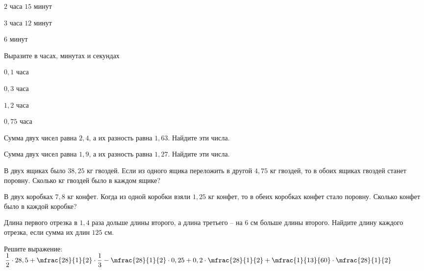 \begin{class}[number=5]
\begin{listofex}
\begin{enumcols}[itemcolumns=4]
			\item \(2\) часа \(15\) минут
			\item \(3\) часа \(12\) минут
			\item \(6\) минут
		\end{enumcols}
		\item Выразите в часах, минутах и секундах
		\begin{enumcols}[itemcolumns=4]
			\item \(0,1\) часа
			\item \(0,3\) часа
			\item \(1,2\) часа
			\item \(0,75\) часа
		\end{enumcols}
		\item Сумма двух чисел равна \(2,4\), а их разность равна \(1,63\). Найдите эти числа.
		\item Сумма двух чисел равна \(1,9\), а их разность равна \(1,27\). Найдите эти числа.
		\item В двух ящиках было \(38,25\) кг гвоздей. Если из одного ящика переложить в другой \(4,75\) кг гвоздей, то в обоих ящиках гвоздей станет поровну. Сколько кг гвоздей было в каждом ящике?
		\item В двух коробках \(7,8\) кг конфет. Когда из одной коробки взяли \(1,25\) кг конфет, то в обеих коробках конфет стало поровну. Сколько конфет было в каждой коробке?
		\item Длина первого отрезка в \(1,4\) раза дольше длины второго, а длина третьего – на \(6\) см больше длины второго. Найдите длину каждого отрезка, если сумма их длин \(125\) см.
		\item Решите выражение: \(\dfrac{1}{2} \cdot 28,5 + \mfrac{28}{1}{2} \cdot \dfrac{1}{3} - \mfrac{28}{1}{2} \cdot 0,25 + 0,2 \cdot \mfrac{28}{1}{2} + \mfrac{1}{13}{60} \cdot \mfrac{28}{1}{2}\)
	\end{listofex}
\end{class}
%
%
%
%	
%
%

